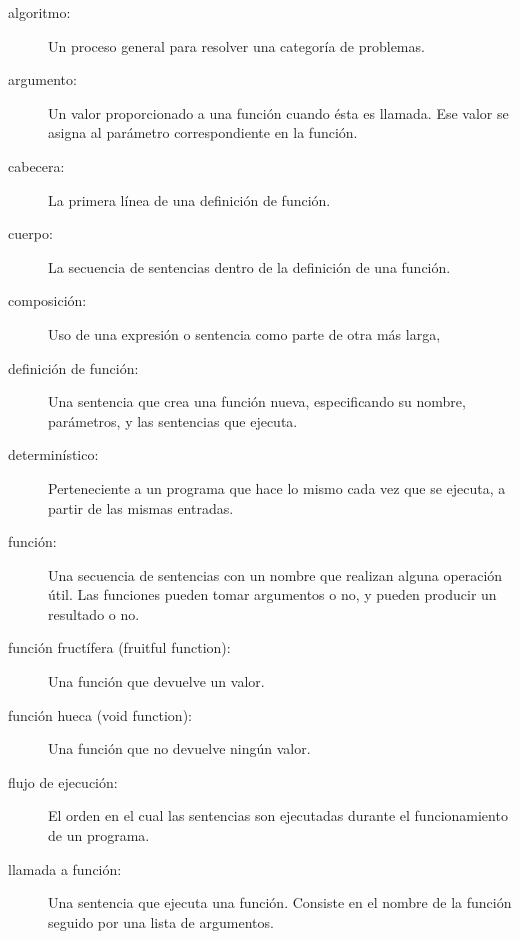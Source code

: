 \begin{description}

\item[algoritmo:] Un proceso general para resolver una categoría de problemas.

\item[argumento:] Un valor proporcionado a una función cuando ésta es llamada.
Ese valor se asigna al parámetro correspondiente en la función.

\item[cabecera:] La primera línea de una definición de función.

\item[cuerpo:] La secuencia de sentencias dentro de la definición de una función.

\item[composición:] Uso de una expresión o sentencia como parte de otra más larga,

\item[definición de función:] Una sentencia que crea una función nueva,
especificando su nombre, parámetros, y las sentencias que ejecuta.

\item[determinístico:] Perteneciente a un programa que hace lo mismo
cada vez que se ejecuta, a partir de las mismas entradas.

\item[función:] Una secuencia de sentencias con un nombre que realizan alguna
operación útil. Las funciones pueden tomar argumentos o no, y pueden
producir un resultado o no.

\item[función fructífera (fruitful function):] Una función que devuelve un valor.

\item[función hueca (void function):] Una función que no devuelve ningún valor.

\item[flujo de ejecución:] El orden en el cual las sentencias son ejecutadas durante
el funcionamiento de un programa.

\item[llamada a función:] Una sentencia que ejecuta una función. Consiste en
el nombre de la función seguido por una lista de argumentos.


\end{description}

